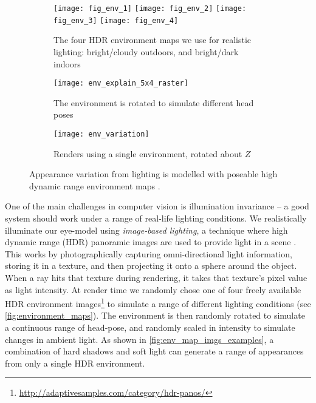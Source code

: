 \begin{figure}
    \begin{subfigure}[t]{\columnwidth}
        \texttt{[image: fig\_env\_1]} \hfill
    	\texttt{[image: fig\_env\_2]} \hfill
        \texttt{[image: fig\_env\_3]} \hfill
    	\texttt{[image: fig\_env\_4]}
	    \caption{The four HDR environment maps we use for realistic lighting: bright/cloudy outdoors, and bright/dark indoors}
    \end{subfigure}
    \par \medskip
    \begin{subfigure}[t]{0.48\columnwidth}
        \texttt{[image: env\_explain\_5x4\_raster]}
    	\caption{The environment is rotated to simulate different head poses}
    \end{subfigure}%
    \hfill
    \begin{subfigure}[t]{0.48\columnwidth}
        \texttt{[image: env\_variation]}
        \caption{Renders using a single environment, rotated about $Z$}
        \label{fig:env_map_imgs_examples}
    \end{subfigure}
    \caption{Appearance variation from lighting is modelled with poseable high dynamic range environment maps \cite{debevec2002image}.}
    \label{fig:environment_maps}
\end{figure}

One of the main challenges in computer vision is illumination invariance -- a good system should work under a range of real-life lighting conditions.
We realistically illuminate our eye-model using \emph{image-based lighting}, a technique where high dynamic range (HDR) panoramic images are used to provide light in a scene \cite{debevec2002image}.
This works by photographically capturing omni-directional light information, storing it in a texture, and then projecting it onto a sphere around the object.
When a ray hits that texture during rendering, it takes that texture's pixel value as light intensity.
At render time we randomly chose one of four freely available HDR environment images\footnote{\url{http://adaptivesamples.com/category/hdr-panos/}} to simulate a range of different lighting conditions (see \autoref{fig:environment_maps}).
The environment is then randomly rotated to simulate a continuous range of head-pose, and randomly scaled in intensity to simulate changes in ambient light.
As shown in \autoref{fig:env_map_imgs_examples}, a combination of hard shadows and soft light can generate a range of appearances from only a single HDR environment.

